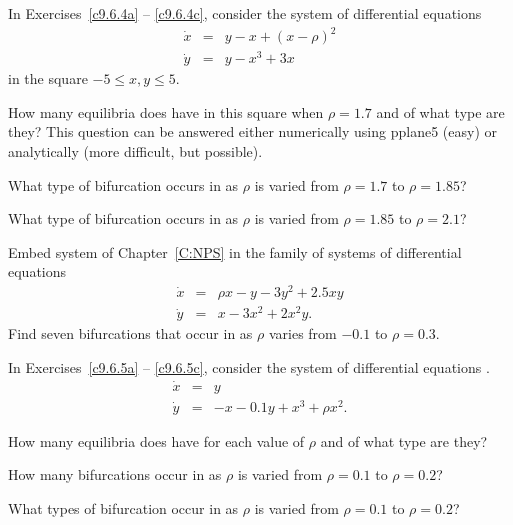 \noindent In Exercises~\ref{c9.6.4a} -- \ref{c9.6.4c}, consider the system 
of differential equations 
\begin{equation*}  \label{E:twoeq}
\begin{array}{rcl}
\dot{x} & = & y - x + (x-\rho)^2 \\
\dot{y} & = & y - x^3 +3x
\end{array}
\end{equation*}
in the square $-5 \leq x,y \leq 5$.
\begin{exercise} \label{c9.6.4a}
How many equilibria does  have in this square when 
$\rho=1.7$ and of what type are they?  This question can be answered either 
numerically using {\sf pplane5} (easy) or analytically (more difficult, but 
possible).
\end{exercise}
\begin{exercise} \label{c9.6.4b}
What type of bifurcation occurs in  as $\rho$ is varied
from $\rho=1.7$ to $\rho=1.85$?
\end{exercise}
\begin{exercise} \label{c9.6.4c}
What type of bifurcation occurs in  as $\rho$ is varied
from $\rho=1.85$ to $\rho=2.1$?
\end{exercise}

\begin{exercise} \label{c9.6.6}
Embed system  of Chapter~\ref{C:NPS} in the family of systems of 
differential equations 
\begin{equation} \label{E:eqn2}
\begin{array}{rcl}
\dot{x} & = & \rho x-y-3y^2+2.5xy\\
\dot{y} & = & x-3x^2+2x^2y.
\end{array}
\end{equation}
Find seven bifurcations that occur in  as $\rho$ varies from 
$-0.1$ to $\rho=0.3$. 
\end{exercise}

\noindent In Exercises~\ref{c9.6.5a} -- \ref{c9.6.5c}, consider the system 
of differential equations .
\begin{equation*}  \label{E:saddleconn}
\begin{array}{rcl}
\dot{x} & = & y  \\
\dot{y} & = & -x - 0.1y + x^3 + \rho x^2.
\end{array}
\end{equation*}
\begin{exercise} \label{c9.6.5a}
How many equilibria does  have for each value of 
$\rho$ and of what type are they?  
\end{exercise}
\begin{exercise} \label{c9.6.5b}
How many bifurcations occur in  as $\rho$ is 
varied from $\rho=0.1$ to $\rho=0.2$?
\end{exercise}
\begin{exercise} \label{c9.6.5c}
What types of bifurcation occur in  as $\rho$ is 
varied from $\rho=0.1$ to $\rho=0.2$?
\end{exercise}



